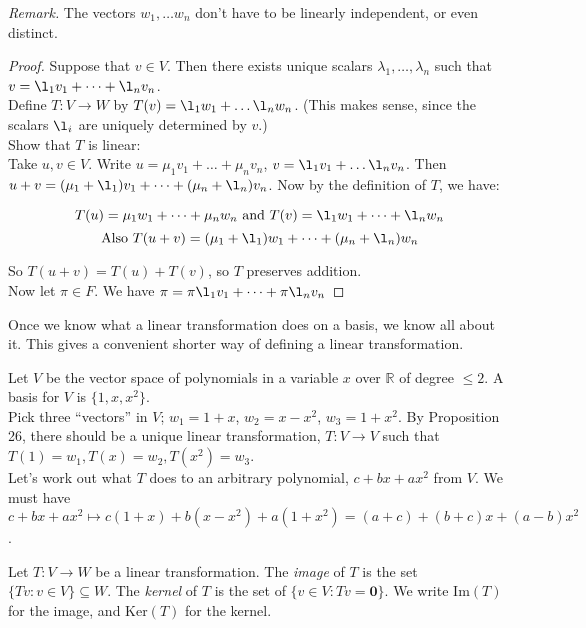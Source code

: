 \textit{Remark.} The vectors $w_1, \dots w_n$ don't have to be linearly independent, or even distinct.
\begin{proof}
Suppose that $v \in V.$ Then there exists unique scalars $\lambda_1,\dots,\lambda_n$ such that $v = \l_1v_1 + \dots + \l_nv_n$.\\

Define $T: V \to W$ by $T(v) = \l_1w_1 + \dots \l_nw_n$. (This makes sense, since the scalars $\l_i$ are uniquely determined by $v$.)\\

Show that $T$ is linear:\\
Take $u,v \in V$. Write $u = \mu_1v_1 + \dots + \mu_nv_n$, $v = \l_1v_1 + \dots \l_nv_n$. Then $u+v = (\mu_1 + \l_1)v_1 + \dots + (\mu_n + \l_n)v_n$. Now by the definition of $T$, we have:

\[T(u) = \mu_1w_1 + \dots + \mu_nw_n \text{ and }T(v) = \l_1w_1 + \dots + \l_nw_n\]
\[\text{Also }T(u+v) = (\mu_1 + \l_1)w_1 + \dots + (\mu_n + \l_n)w_n\]

So $T(u+v) = T(u) + T(v)$, so $T$ preserves addition.\\

Now let $\pi \in F$. We have $\pi = \pi\l_1v_1 + \dots + \pi\l_nv_n$
\end{proof}

\begin{remark} Once we know what a linear transformation does on a basis, we know all about it. This gives a convenient shorter way of defining a linear transformation. 	
\end{remark}


\begin{example} Let $V$ be the vector space of polynomials in a variable $x$ over $\mathbb{R}$ of degree $\leq 2$. A basis for $V$ is $\{1,x,x^2\}$.\\

Pick three ``vectors'' in $V$; $w_1 = 1+x$, $w_2 = x-x^2$, $w_3 = 1+x^2$. By Proposition 26, there should be a unique linear transformation, $T: V\to V$ such that $T(1) = w_1, T(x) = w_2, T(x^2) = w_3$.\\

Let's work out what $T$ does to an arbitrary polynomial, $c + bx + ax^2$ from $V$. We must have $c + bx + ax^2 \longmapsto c(1+x) + b(x-x^2) + a(1+x^2) = (a+c) + (b+c)x + (a-b)x^2$.
\end{example}

  
 
\begin{definition}   
 Let $T: V \to W$ be a linear transformation. The \emph{image} of $T$ is the set $\{Tv : v\in V\} \subseteq W$. The \emph{kernel} of $T$ is the set of $\{ v \in V: Tv = \mathbf{0} \}$. We write Im$(T)$ for the image, and Ker$(T)$ for the kernel. 
 \end{definition}

